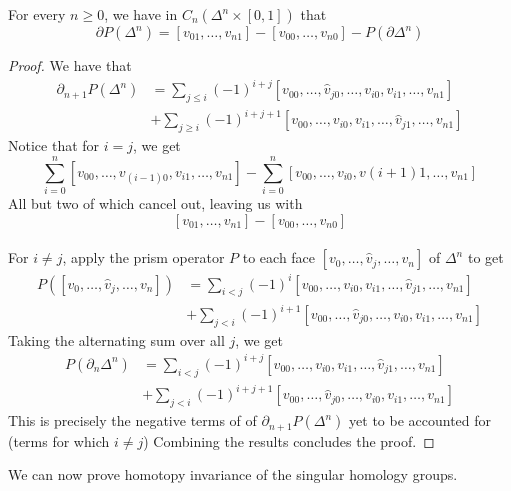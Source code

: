 \documentclass[a4paper]{article}
\begin{document}
\begin{lmm}{}{} For every $n\geq 0$, we have in $C_n(\Delta^n\times[0,1])$ that $$\partial P(\Delta^n)=[v_{01},\dots,v_{n1}]-[v_{00},\dots,v_{n0}]-P(\partial\Delta^n)$$ 
\begin{proof} We have that
\begin{align*}
\partial_{n+1}P(\Delta^n)&=\sum_{j\leq i}(-1)^{i+j}[v_{00},\dots,\hat{v}_{j0},\dots,v_{i0},v_{i1},\dots,v_{n1}]\\
&+\sum_{j\geq i}(-1)^{i+j+1}[v_{00},\dots,v_{i0},v_{i1},\dots,\hat{v}_{j1},\dots,v_{n1}]
\end{align*}
Notice that for $i=j$, we get $$\sum_{i=0}^n[v_{00},\dots,v_{(i-1)0},v_{i1},\dots,v_{n1}]-\sum_{i=0}^n[v_{00},\dots,v_{i0},v{(i+1)1},\dots,v_{n1}]$$
All but two of which cancel out, leaving us with $$[v_{01},\dots,v_{n1}]-[v_{00},\dots,v_{n0}]$$~\\
For $i\neq j$, apply the prism operator $P$ to each face $[v_0,\dots,\hat{v}_j,\dots,v_n]$ of $\Delta^n$ to get 
\begin{align*}
P([v_0,\dots,\hat{v}_j,\dots,v_n])&=\sum_{i<j}(-1)^i[v_{00},\dots,v_{i0},v_{i1},\dots,\hat{v}_{j1},\dots,v_{n1}]\\
&+\sum_{j<i}(-1)^{i+1}[v_{00},\dots,\hat{v}_{j0},\dots,v_{i0},v_{i1},\dots,v_{n1}]
\end{align*}
Taking the alternating sum over all $j$, we get 
\begin{align*}
P(\partial_n\Delta^n)&=\sum_{i<j}(-1)^{i+j}[v_{00},\dots,v_{i0},v_{i1},\dots,\hat{v}_{j1},\dots,v_{n1}]\\
&+\sum_{j<i}(-1)^{i+j+1}[v_{00},\dots,\hat{v}_{j0},\dots,v_{i0},v_{i1},\dots,v_{n1}]
\end{align*}
This is precisely the negative terms of of $\partial_{n+1}P(\Delta^n)$ yet to be accounted for (terms for which $i\neq j$) Combining the results concludes the proof. 
\end{proof}
\end{lmm}

We can now prove homotopy invariance of the singular homology groups. 
\end{document}
